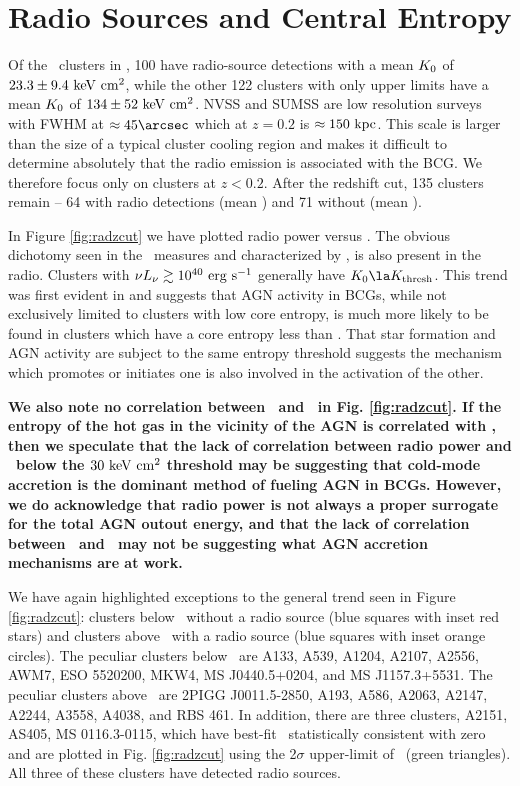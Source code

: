 \documentclass[12pt,preprint]{aastex}
\begin{document}
\section{Radio Sources and Central Entropy}
\label{sec:agn}

Of the \clnum\ clusters in \accept, 100 have radio-source detections
with a mean $K_0$ of $23.3 \pm 9.4 \mathrm{\mbox{\ensuremath{\mathrm{~keV}}} \mathrm{\mbox{\ensuremath{\mathrm{~cm}}}^2}}$, while the other 122
clusters with only upper limits have a mean $K_0$ of $134 \pm 52
\mathrm{\mbox{\ensuremath{\mathrm{~keV}}} \mathrm{\mbox{\ensuremath{\mathrm{~cm}}}^2}}$. NVSS and SUMSS are low resolution surveys with FWHM at $\approx
45\arcsec$ which at $z = 0.2$ is $\approx 150\mbox{\ensuremath{\mathrm{~kpc}}}$. This scale is
larger than the size of a typical cluster cooling region and makes it
difficult to determine absolutely that the radio emission is
associated with the BCG. We therefore focus only on clusters at $z <
0.2$. After the redshift cut, 135 clusters remain -- 64 with radio
detections (mean \frad) and 71 without (mean \nfrad).

In Figure \ref{fig:radzcut} we have plotted radio power versus \kna.
The obvious dichotomy seen in the \halpha\ measures and characterized
by \kthr, is also present in the radio. Clusters with $\nu L_{\nu} \gtrsim
10^{40} \mathrm{\mbox{\ensuremath{\mathrm{~erg}}} \mathrm{\mbox{\ensuremath{\mathrm{~s}}}^{-1}}}$ generally have $\kna \la \kthr$. This trend was first
evident in \citet{radioquiet} and suggests that AGN activity in BCGs,
while not exclusively limited to clusters with low core entropy, is
much more likely to be found in clusters which have a core entropy
less than \kthr. That star formation and AGN activity are subject to
the same entropy threshold suggests the mechanism which promotes or
initiates one is also involved in the activation of the other.

{\bf{We also note no correlation between \radpow\ and \kna\ in
    Fig. \ref{fig:radzcut}. If the entropy of the hot gas in the
    vicinity of the AGN is correlated with \kna, then we speculate
    that the lack of correlation between radio power and \kna\ below
    the $30 \mathrm{\mbox{\ensuremath{\mathrm{~keV}}} \mathrm{\mbox{\ensuremath{\mathrm{~cm}}}^2}}$ threshold may be suggesting that cold-mode accretion
    \citep{pizzolato05, hardcastle07} is the dominant method of
    fueling AGN in BCGs. However, we do acknowledge that radio power
    is not always a proper surrogate for the total AGN outout energy,
    and that the lack of correlation between \radpow\ and \kna\ may
    not be suggesting what AGN accretion mechanisms are at work.}}

We have again highlighted exceptions to the general trend seen in
Figure \ref{fig:radzcut}: clusters below \kthr\ without a radio source
(blue squares with inset red stars) and clusters above \kthr\ with a
radio source (blue squares with inset orange circles). The peculiar
clusters below \kthr\ are A133, A539, A1204, A2107, A2556, AWM7, ESO
5520200, MKW4, MS J0440.5+0204, and MS J1157.3+5531. The peculiar
clusters above \kthr\ are 2PIGG J0011.5-2850, A193, A586, A2063,
A2147, A2244, A3558, A4038, and RBS 461. In addition, there are three
clusters, A2151, AS405, MS 0116.3-0115, which have best-fit
\kna\ statistically consistent with zero and are plotted in
Fig. \ref{fig:radzcut} using the 2$\sigma$ upper-limit of \kna\ (green
triangles). All three of these clusters have detected radio sources.
\end{document}
